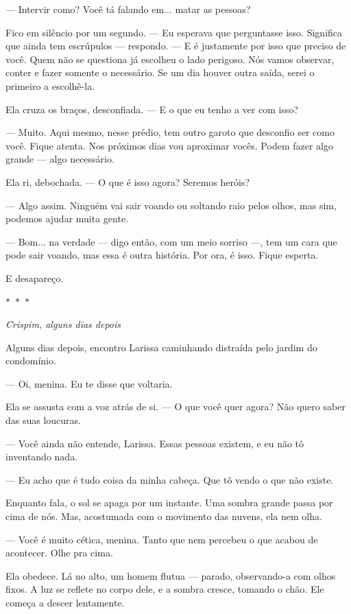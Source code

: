 — Intervir como? Você tá falando em... matar as pessoas?

Fico em silêncio por um segundo.  
— Eu esperava que perguntasse isso. Significa que ainda tem escrúpulos — respondo. — E é justamente por isso que preciso de você. Quem não se questiona já escolheu o lado perigoso. Nós vamos observar, conter e fazer somente o necessário. Se um dia houver outra saída, serei o primeiro a escolhê-la.

Ela cruza os braços, desconfiada.  
— E o que eu tenho a ver com isso?

— Muito.  
Aqui mesmo, nesse prédio, tem outro garoto que desconfio ser como você.  
Fique atenta.  
Nos próximos dias vou aproximar vocês.  
Podem fazer algo grande — algo necessário.

Ela ri, debochada.  
— O que é isso agora? Seremos heróis?

— Algo assim.  
Ninguém vai sair voando ou soltando raio pelos olhos, mas sim, podemos ajudar muita gente.  

— Bom... na verdade — digo então, com um meio sorriso —, tem um cara que pode sair voando, mas essa é outra história.
Por ora, é isso.  
Fique esperta.  

E desapareço.

\begin{center}
$\ast$~$\ast$~$\ast$

\textit{Crispim, alguns dias depois}
\end{center}

Alguns dias depois, encontro Larissa caminhando distraída pelo jardim do condomínio.

— Oi, menina. Eu te disse que voltaria.  

Ela se assusta com a voz atrás de si.  
— O que você quer agora? Não quero saber das suas loucuras.

— Você ainda não entende, Larissa. Essas pessoas existem, e eu não tô inventando nada.  

— Eu acho que é tudo coisa da minha cabeça. Que tô vendo o que não existe.  

Enquanto fala, o sol se apaga por um instante.  
Uma sombra grande passa por cima de nós.
Mas, acostumada com o movimento das nuvens, ela nem olha.

— Você é muito cética, menina.  
Tanto que nem percebeu o que acabou de acontecer.  
Olhe pra cima.

Ela obedece.  
Lá no alto, um homem flutua — parado, observando-a com olhos fixos.  
A luz se reflete no corpo dele, e a sombra cresce, tomando o chão.  
Ele começa a descer lentamente.

